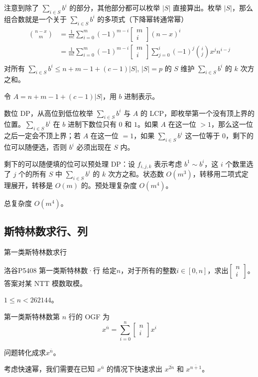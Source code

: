 \documentclass[UTF8]{beamer}
\begin{document}
    \begin{frame}
注意到除了 $\sum_{i\in S}b^i$ 的部分，其他部分都可以枚举 $|S|$ 直接算出。枚举 $|S|$，那么组合数就是一个关于 $\sum_{i\in S}b^i$ 的多项式（下降幂转通常幂）
$$
\begin{aligned}
\binom{n-x}{m}&=\frac{1}{m!}\sum_{i=0}^m(-1)^{m-i}\begin{bmatrix}m\\i\end{bmatrix}(n-x)^i\\
&=\frac{1}{m!}\sum_{i=0}^m(-1)^{m-i}\begin{bmatrix}m\\i\end{bmatrix}\sum_{j=0}^i(-1)^j\binom{i}{j}x^jn^{i-j}\\
\end{aligned}
$$
对所有  $\sum_{i\in S}b^i\le n+m-1+(c-1)|S|$, $|S|=p$ 的 $S$ 维护 $\sum_{i\in S}b^i$ 的 $k$ 次方之和。
    \end{frame}

    \begin{frame}
        令 $A=n+m-1+(c-1)|S|$，用 $b$ 进制表示。

        数位 DP，从高位到低位枚举 $\sum_{i\in S}b^i$ 与 $A$ 的 LCP，即枚举第一个没有顶上界的位置。$\sum_{i\in S}b^i$ 在 $b$ 进制下数位只有 $0$ 和 $1$。如果 $A$ 在这一位 $>1$，那么这一位之后一定会不顶上界；若 $A$ 在这一位 $=1$，如果 $\sum_{i\in S}b^i$ 这一位等于 $0$，剩下的位可以随便选，否则 $b^i$ 必须出现在 $S$ 内。

        剩下的可以随便填的位可以预处理 DP：设 $f_{i,j,k}$ 表示考虑 $b^1\sim b^i$，这 $i$ 个数里选了 $j$ 个的所有 $S$ 中 $\sum_{i\in S}b^i$ 的 $k$ 次方之和。状态数 $O(m^3)$，转移用二项式定理展开，转移是 $O(m)$ 的。预处理复杂度 $O(m^4)$。
        
        总复杂度 $O(m^4)$。
    \end{frame}

    \subsection{斯特林数求行、列}
    \begin{frame}{第一类斯特林数求行}
        \begin{block}{洛谷P5408 第一类斯特林数·行}
    给定$n$，对于所有的整数$i\in[0,n]$，求出$\begin{bmatrix}n\\ i\end{bmatrix}$。答案对某 NTT 模数取模。

    $1\le n< 262144$。
        \end{block}
        \pause
        第一类斯特林数第 $n$ 行的 OGF 为
        $$
        x^{\overline{n}}=\sum\limits_{i=0}^n\begin{bmatrix}n\\i\end{bmatrix}x^i
        $$

        问题转化成求$x^{\overline{n}}$。

        考虑快速幂，我们需要在已知 $x^{\overline{n}}$ 的情况下快速求出 $x^{\overline{2n}}$ 和 $x^{\overline{n+1}}$。
    \end{frame}
\end{document}
